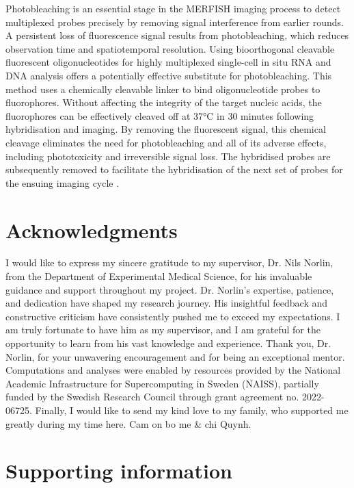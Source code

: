 \documentclass[10pt,letterpaper]{article}
\begin{document}
\noindent Photobleaching is an essential stage in the MERFISH imaging process to detect multiplexed probes precisely by removing signal interference from earlier rounds. A persistent loss of fluorescence signal results from photobleaching, which reduces observation time and spatiotemporal resolution. Using bioorthogonal cleavable fluorescent oligonucleotides for highly multiplexed single-cell in situ RNA and DNA analysis offers a potentially effective substitute for photobleaching. This method uses a chemically cleavable linker to bind oligonucleotide probes to fluorophores. Without affecting the integrity of the target nucleic acids, the fluorophores can be effectively cleaved off at 37°C in 30 minutes following hybridisation and imaging. By removing the fluorescent signal, this chemical cleavage eliminates the need for photobleaching and all of its adverse effects, including phototoxicity and irreversible signal loss. The hybridised probes are subsequently removed to facilitate the hybridisation of the next set of probes for the ensuing imaging cycle \parencite{mondal-2018}.
\section*{Acknowledgments}
I would like to express my sincere gratitude to my supervisor, Dr. Nils Norlin, from the Department of Experimental Medical Science, for his invaluable guidance and support throughout my project. Dr. Norlin's expertise, patience, and dedication have shaped my research journey. His insightful feedback and constructive criticism have consistently pushed me to exceed my expectations. I am truly fortunate to have him as my supervisor, and I am grateful for the opportunity to learn from his vast knowledge and experience. Thank you, Dr. Norlin, for your unwavering encouragement and for being an exceptional mentor. Computations and analyses were enabled by resources provided by the National Academic Infrastructure for Supercomputing in Sweden (NAISS), partially funded by the Swedish Research Council through grant agreement no. 2022-06725. Finally, I would like to send my kind love to my family, who supported me greatly during my time here. Cam on bo me \& chi Quynh.
\nolinenumbers

\printbibliography
\newpage
\section*{Supporting information}
\end{document}

